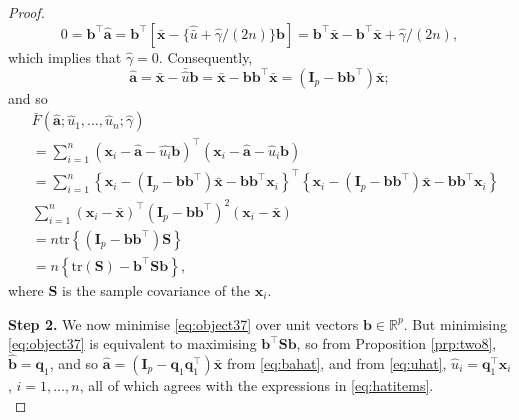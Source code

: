 \documentclass[]{book}
\theoremstyle{definition}
\theoremstyle{definition}
\theoremstyle{definition}
\theoremstyle{remark}
\begin{document}
\begin{proof}
\[
0=\boldsymbol b^\top \hat{\boldsymbol a} =\boldsymbol b^\top [\bar{\boldsymbol x}-\{\hat{\bar{u}}+\hat{\gamma}/(2n)\}\boldsymbol b]=\boldsymbol b^\top \bar{\boldsymbol x}-\boldsymbol b^\top \bar{\boldsymbol x}
+\hat{\gamma}/(2n),
\]
which implies that \(\hat{\gamma}=0\). Consequently,
\begin{equation}
\hat{\boldsymbol a}=\bar{\boldsymbol x}-\bar{\hat{u}}\boldsymbol b=\bar{\boldsymbol x}-\boldsymbol b\boldsymbol b^\top \bar{\boldsymbol x}=\left ( \boldsymbol I_p-\boldsymbol b\boldsymbol b^\top \right ) \bar{\boldsymbol x};
\label{eq:bahat}
\end{equation}
and so
\begin{align}
&\bar{F}(\hat{\boldsymbol a}; \hat{u}_1, \ldots, \hat{u}_n; \hat{\gamma})\\
&=\sum_{i=1}^n (\boldsymbol x_i-\hat{\boldsymbol a}-\hat{u_i} \boldsymbol b)^\top (\boldsymbol x_i -\hat{\boldsymbol a}-\hat{u}_i\boldsymbol b)\nonumber \\
&=\sum_{i=1}^n \left \{\boldsymbol x_i-({\mathbf I}_p-\boldsymbol b\boldsymbol b^\top)\bar{\boldsymbol x}- \boldsymbol b\boldsymbol b^\top \boldsymbol x_i \right \}^\top \left \{\boldsymbol x_i -({\mathbf I}_p-\boldsymbol b\boldsymbol b^\top)\bar{\boldsymbol x} -\boldsymbol b\boldsymbol b^\top \boldsymbol x_i\right \}\nonumber \\
&\sum_{i=1}^n (\boldsymbol x_i -\bar{\boldsymbol x})^\top ({\mathbf I}_p -\boldsymbol b\boldsymbol b^\top)^2 (\boldsymbol x_i -\bar{\boldsymbol x})\nonumber \\
&= n \text{tr}\left \{ ({\mathbf I}_p-\boldsymbol b\boldsymbol b^\top )\boldsymbol S\right \} \nonumber \\
&=n\left \{\text{tr}(\boldsymbol S)-\boldsymbol b^\top \boldsymbol S\boldsymbol b\right\},
\label{eq:object37}
\end{align}
where \(\boldsymbol S\) is the sample covariance of the \(\boldsymbol x_i\).

\textbf{Step 2.} We now minimise \eqref{eq:object37} over unit vectors \(\boldsymbol b\in \mathbb{R}^p\). But minimising \eqref{eq:object37} is equivalent to maximising \(\boldsymbol b^\top \boldsymbol S\boldsymbol b\), so
from Proposition \ref{prp:two8}, \(\hat{\boldsymbol b}= \boldsymbol q_1\), and so \(\hat{\boldsymbol a}=(\boldsymbol I_p-\boldsymbol q_1 \boldsymbol q_1^\top)\bar{\boldsymbol x}\) from \eqref{eq:bahat}, and
from \eqref{eq:uhat}, \(\hat{u}_i=\boldsymbol q_1^\top \boldsymbol x_i\), \(i=1,\ldots , n\), all of which agrees with the expressions in \eqref{eq:hatitems}.\\
\end{proof}
\end{document}
